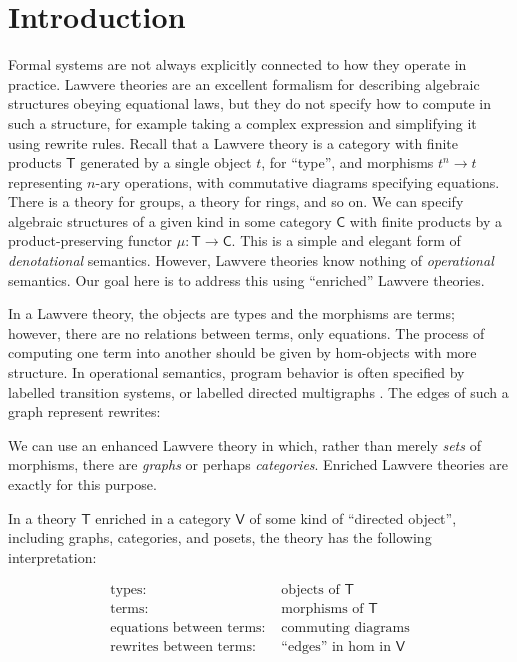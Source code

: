 \documentclass{amsart}
\theoremstyle{definition}
\newcommand{\V}{\mathsf{V}}
\newcommand{\C}{\mathsf{C}}
\newcommand{\T}{\mathsf{T}}
\newcommand{\maps}{\colon}
\begin{document}
\section{Introduction}

Formal systems are not always explicitly connected to how they operate in practice.   Lawvere theories  \cite{lawvere} are an excellent formalism for describing algebraic structures obeying equational laws, but they do not specify how to compute in such a structure, for example taking a complex expression and simplifying it using rewrite rules.   Recall that a Lawvere theory is a category with finite products $\T$ generated by a single object $t$, for ``type'', and morphisms $t^n \to t$ representing $n$-ary operations, with commutative diagrams specifying equations.   There is a theory for groups, a theory for rings, and so on.   We can specify algebraic structures of a given kind in some category $\C$ with finite products by a product-preserving functor $\mu \maps\T \to \C$.   This is a simple and elegant form of \emph{denotational} semantics.    However, Lawvere theories know nothing of \emph{operational} semantics.  Our goal here is to address this using ``enriched'' Lawvere theories.

In a Lawvere theory, the objects are types and the morphisms are terms; however, there are no relations between terms, only equations. The process of computing one term into another should be given by hom-objects with more structure.  In operational semantics, program behavior is often specified by labelled transition systems, or labelled directed multigraphs \cite{sos}.  The edges of such a graph represent rewrites:
\begin{center}\end{center}
We can use an enhanced Lawvere theory in which, rather than merely \emph{sets} of morphisms, there are \emph{graphs} or perhaps \emph{categories}. Enriched Lawvere theories are exactly for this purpose.

In a theory $\T$ enriched in a category $\V$ of some kind of ``directed object'', including graphs, categories, and posets, the theory has the following interpretation:

\[\begin{array}{rl}
\text{types: } & \text{objects of } \T\\
\text{terms: } & \text{morphisms of } \T\\
\text{equations between terms: } & \text{commuting diagrams}\\
\text{rewrites between terms: } & \text{``edges'' in hom in } \V\\
\end{array}\]
\end{document}
